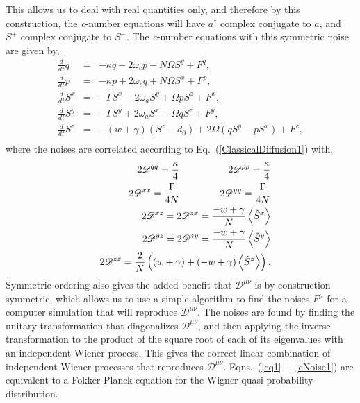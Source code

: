 \documentclass[aps,
twocolumn,
superscriptaddress,groupedaddress]{revtex4}
\begin{document}
This allows us to deal with real quantities only, and therefore by this
construction, the {\it c}-number equations will have $a^{\dagger}$ complex
conjugate to $a$, and $S^+$  complex conjugate to $S^-$.
The {\it c}-number equations with this symmetric noise are given by,
\begin{eqnarray}
\frac{d}{dt} q &=& -\kappa q - 2 \omega_c p - N \Omega S^{y} + F^{q},
\label{cq1}
\\
\frac{d}{dt} p&=& -\kappa p + 2 \omega_c q + N \Omega S^{x} + F^{p},
\\
\frac{d}{dt} S^{x} &=&
-\Gamma S^{x}  - 2 \omega_a S^{y} + \Omega p S^{z} + F^{x},
\\
\frac{d}{dt} S^{y} &=&
-\Gamma S^{y}  + 2 \omega_a S^{x} - \Omega q S^{z} + F^{y},
\\
\frac{d}{dt} S^{z} &=& -(w+\gamma)\left( S^{z} - d_0\right)
+2 \Omega \left( q S^{y} - p S^{x} \right)
+F^{z},
\nonumber
\\
\end{eqnarray}
where the noises are correlated according to Eq.~(\ref{ClassicalDiffusion1}) with,
\begin{eqnarray}
&& 2\mathscr{D}^{q q}=
\frac{\kappa}{4} \hspace{0.7in} 2\mathscr{D}^{p p}=
\frac{\kappa}{4} \nonumber \\
&& 2\mathscr{D}^{xx}=
\frac{\Gamma}{4N} \hspace{0.57in} 2\mathscr{D}^{yy}=
\frac{\Gamma}{4N} \nonumber \\
&& 2\mathscr{D}^{xz}=
2\mathscr{D}^{zx}=
\frac{-w+\gamma}{N} \left< \hat{S}^{x} \right>  \nonumber \\
&& 2\mathscr{D}^{yz}=
2\mathscr{D}^{zy}=
\frac{-w+\gamma}{N} \left< \hat{S}^{y} \right>  \nonumber \\
&& 2\mathscr{D}^{zz}=
\frac{2}{N}\left((w+\gamma) + (-w+\gamma)  \left< \hat{S}^{z} \right> \right).
\label{cNoise1}
\end{eqnarray}
Symmetric ordering also gives the added benefit that $\mathscr{D}^{\mu
\nu}$ is by construction symmetric, which allows us to use a simple
algorithm to find the noises $F^\mu$ for a computer simulation that will
reproduce $\mathscr{D}^{\mu \nu}$.  The noises are found by finding the
unitary transformation that diagonalizes $\mathscr{D}^{\mu \nu}$, and
then applying the inverse transformation to the product of the square
root of each of its eigenvalues with an independent Wiener process. This
gives the correct linear combination of independent Wiener processes
that reproduces $\mathscr{D}^{\mu \nu}$.
Eqns.~(\ref{cq1}~--~\ref{cNoise1}) are equivalent to a Fokker-Planck
equation for the Wigner quasi-probability distribution.
\end{document}
